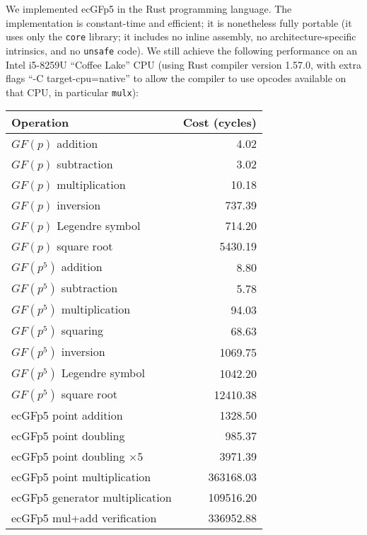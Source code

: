 \documentclass{llncs}
\newcommand{\GF}{GF}
\begin{document}
We implemented ecGFp5 in the Rust programming language. The
implementation is constant-time and efficient; it is nonetheless fully
portable (it uses only the \verb+core+ library; it includes no inline
assembly, no architecture-specific intrinsics, and no \verb+unsafe+
code). We still achieve the following performance on an Intel i5-8259U
``Coffee Lake'' CPU (using Rust compiler version 1.57.0, with
extra flags ``-C target-cpu=native'' to allow the compiler to use
opcodes available on that CPU, in particular \verb+mulx+):
\begin{center}
    \begin{tabular}{|l|r|}
        \hline
        \textsf{\textbf{Operation}} & \textsf{\textbf{Cost (cycles)}} \\
        \hline
        $\GF(p)$ addition                &      4.02 \\
        $\GF(p)$ subtraction             &      3.02 \\
        $\GF(p)$ multiplication          &     10.18 \\
        $\GF(p)$ inversion               &    737.39 \\
        $\GF(p)$ Legendre symbol         &    714.20 \\
        $\GF(p)$ square root             &   5430.19 \\
        \hline
        $\GF(p^5)$ addition              &      8.80 \\
        $\GF(p^5)$ subtraction           &      5.78 \\
        $\GF(p^5)$ multiplication        &     94.03 \\
        $\GF(p^5)$ squaring              &     68.63 \\
        $\GF(p^5)$ inversion             &   1069.75 \\
        $\GF(p^5)$ Legendre symbol       &   1042.20 \\
        $\GF(p^5)$ square root           &  12410.38 \\
        \hline
        ecGFp5 point addition            &   1328.50 \\
        ecGFp5 point doubling            &    985.37 \\
        ecGFp5 point doubling $\times 5$ &   3971.39 \\
        ecGFp5 point multiplication      & 363168.03 \\
        ecGFp5 generator multiplication  & 109516.20 \\
        ecGFp5 mul+add verification      & 336952.88 \\
        \hline
    \end{tabular}
\end{center}
\end{document}
